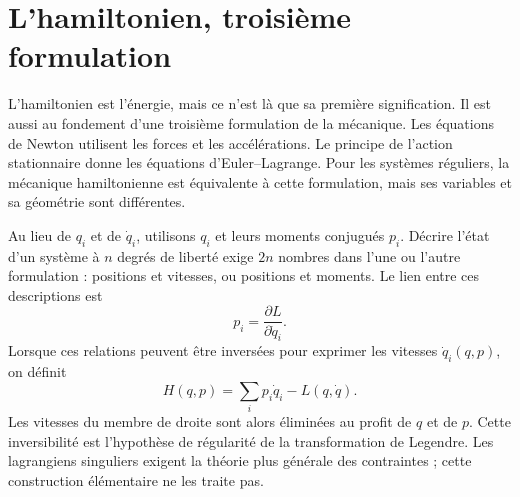 \begin{classroomqa}
\end{classroomqa}

\begin{classroomqa}
\end{classroomqa}

\section{L’hamiltonien, troisième formulation}

L’hamiltonien est l’énergie, mais ce n’est là que sa première signification. Il est aussi au fondement d’une troisième formulation de la mécanique. Les équations de Newton utilisent les forces et les accélérations. Le principe de l’action stationnaire donne les équations d’Euler--Lagrange. Pour les systèmes réguliers, la mécanique hamiltonienne est équivalente à cette formulation, mais ses variables et sa géométrie sont différentes.

Au lieu de \(q_i\) et de \(\dot q_i\), utilisons \(q_i\) et leurs moments conjugués \(p_i\). Décrire l’état d’un système à \(n\) degrés de liberté exige \(2n\) nombres dans l’une ou l’autre formulation : positions et vitesses, ou positions et moments. Le lien entre ces descriptions est
\begin{equation}
  p_i=\frac{\partial L}{\partial\dot q_i}.
  \label{eq:l6-legendre-map}
\end{equation}
Lorsque ces relations peuvent être inversées pour exprimer les vitesses \(\dot q_i(q,p)\), on définit
\begin{equation}
  H(q,p)=\sum_i p_i\dot q_i-L(q,\dot q).
  \label{eq:l6-hamiltonian-definition}
\end{equation}
Les vitesses du membre de droite sont alors éliminées au profit de \(q\) et de \(p\). Cette inversibilité est l’hypothèse de régularité de la transformation de Legendre. Les lagrangiens singuliers exigent la théorie plus générale des contraintes ; cette construction élémentaire ne les traite pas.

